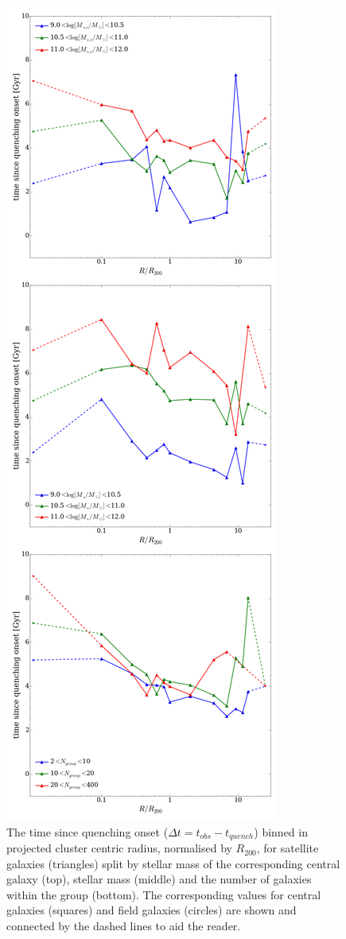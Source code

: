 \documentclass[useAMS,usenatbib]{mn2e}
\begin{document}
\begin{figure}
\includegraphics[height=0.875\textheight]{time_since_quenching_environment_properties_three.png}
\caption{The time since quenching onset ($\Delta t = t_{obs} - t_{quench}$) binned in projected cluster centric radius, normalised by $R_{200}$, for satellite galaxies (triangles) split by stellar mass of the corresponding central galaxy (top), stellar mass (middle) and the number of galaxies within the group (bottom). The corresponding values for central galaxies (squares) and field galaxies (circles) are shown and connected by the dashed lines to aid the reader.}
\label{fig:timesinceradius}
\end{figure}
\end{document}
